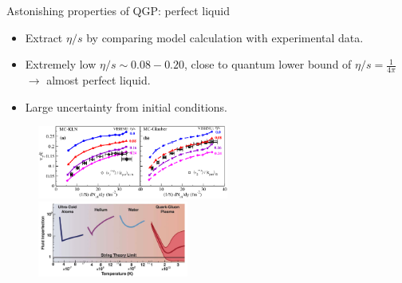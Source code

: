 \documentclass[11pt]{beamer}
\begin{document}
\begin{frame}{Astonishing properties of QGP: perfect liquid}
\begin{itemize}
\item Extract $\eta/s$ by comparing model calculation with experimental data.
\item Extremely low $\eta/s \sim 0.08 - 0.20$, close to quantum lower bound of $\eta/s = \frac{1}{4\pi}$ $\rightarrow$ almost perfect liquid.
\item \color{red}Large uncertainty from initial conditions.
\end{itemize}
\begin{center}
\begin{figure}
\includegraphics[width=0.56\textwidth]{./pics/song.png}
\includegraphics[width=0.44\textwidth]{./pics/eta_s.png}
\end{figure}
\end{center}
\end{frame}

\end{document}
